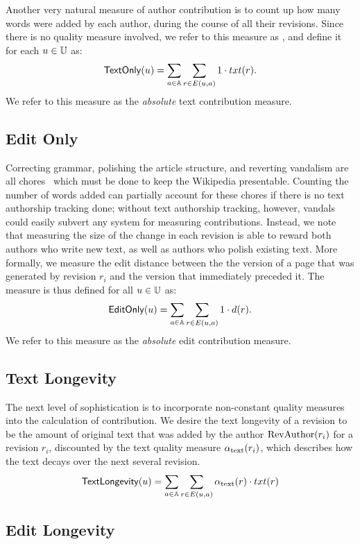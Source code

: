 \noindent
Another very natural measure of author contribution
is to count up how many words were added by each author,
during the course of all their revisions.
Since there is no quality measure involved,
we refer to this measure as \textonly,
and define it for each $u \in \mathbb{U}$ as:
%
\[
\mathsf{TextOnly}(u) = \sum_{a \in \mathbb{A}} \sum_{r \in E(u, a)} 1 \cdot txt(r).
\]
%
We refer to this measure as the {\em absolute\/} text contribution
measure.

\subsection{Edit Only}

\noindent
Correcting grammar, polishing the article structure,
and reverting vandalism are all chores~\cite{AdministratorMop2008}
which must be done to keep the Wikipedia presentable.
Counting the number of words added can partially account
for these chores if there is no text authorship tracking done;
without text authorship tracking, however, vandals could
easily subvert any system for measuring contributions.
Instead, we note that measuring the size of the change
in each revision is able to reward both authors who write
new text, as well as authors who polish existing text.
More formally, we measure the edit distance between the
the version of a page that was generated by revision $r_i$
and the version that immediately preceded it.
The \editonly measure is thus defined for all $u \in \mathbb{U}$ as:
%
\[
\mathsf{EditOnly}(u) = \sum_{a \in \mathbb{A}} \sum_{r \in E(u, a)} 1 \cdot d(r).
\]
%
We refer to this measure as the {\em absolute\/} edit contribution
measure.

\subsection{Text Longevity}

\noindent
The next level of sophistication is to incorporate
non-constant quality measures into the calculation of contribution.
We desire the text longevity of a revision to be
the amount of original text that was
added by the author $\mathrm{RevAuthor}(r_i)$ for a revision $r_i$, discounted by the
text quality measure $\alpha_\text{text}(r_i)$, which describes
how the text decays over the next several revision.
%
\[
\mathsf{TextLongevity}(u) = 
\sum_{a \in \mathbb{A}} \sum_{r \in E(u, a)} \alpha_\text{text}(r) \cdot txt(r)
\]
%

\subsection{Edit Longevity}

